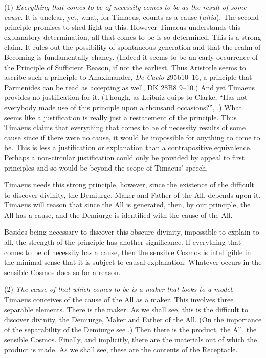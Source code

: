 (1) \emph{Everything that comes to be of necessity comes to be as the result of some cause}. It is unclear, yet, what, for Timaeus, counts as a cause (\emph{aitia}). The second principle promises to shed light on this. However Timaeus understands this explanatory determination, all that comes to be is so determined. This is a strong claim. It rules out the possibility of spontaneous generation and that the realm of Becoming is fundamentally chancy. (Indeed it seems to be an early occurrence of the Principle of Sufficient Reason, if not the earliest. Thus Aristotle seems to ascribe such a principle to Anaximander, \emph{De Caelo} 295b10--16, a principle that Parmenides can be read as accepting as well, DK 28B8 9--10.) And yet Timaeus provides no justification for it. (Though, as Leibniz quips to Clarke, ``Has not everybody made use of this principle upon a thousand occasions?'', \citealt[346]{Ariew:1989la}.) What seems like a justification is really just a restatement of the principle. Thus Timaeus claims that everything that comes to be of necessity results of some cause since if there were no cause, it would be impossible for anything to come to be. This is less a justification or explanation than a contrapositive equivalence. Perhaps a non-circular justification could only be provided by appeal to first principles and so would be beyond the scope of Timaeus' speech.

Timaeus needs this strong principle, however, since the existence of the difficult to discover divinity, the Demiurge, Maker and Father of the All, depends upon it. Timaeus will reason that since the All is generated, then, by our principle, the All has a cause, and the Demiurge is identified with the cause of the All. 

Besides being necessary to discover this obscure divinity, impossible to explain to all, the strength of the principle has another significance. If everything that comes to be of necessity has a cause, then the sensible Cosmos is intelligible in the minimal sense that it is subject to causal explanation. Whatever occurs in the sensible Cosmos does so for a reason.

(2) \emph{The cause of that which comes to be is a maker that looks to a model}. Timaeus conceives of the cause of the All as a maker. This involves three separable elements. There is the maker. As we shall see, this is the difficult to discover divinity, the Demiurge, Maker and Father of the All. (On the importance of the separability of the Demiurge see \citealt[chapter 1]{Broadie:2012vl}.) Then there is the product, the All, the sensible Cosmos. Finally, and implicitly, there are the materials out of which the product is made. As we shall see, these are the contents of the Receptacle. 

